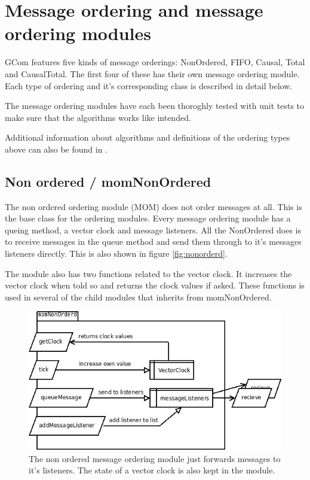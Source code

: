 \documentclass[english]{article}
\begin{document}
\section{Message ordering and message ordering modules}
\label{messageordering}
GCom features five kinds of message orderings: NonOrdered, FIFO, Causal, Total and CausalTotal. The first four of these has their own message ordering module. Each type of ordering and it's corresponding class is described in detail below.

The message ordering modules have each been thoroghly tested with unit tests to make sure that the algorithms works like intended.

Additional information about algorithms and definitions of the ordering types above can also be found in \cite{distsys-ordering}.

\subsection{Non ordered / momNonOrdered}
The non ordered ordering module (MOM) does not order messages at all. This is the base class for the ordering modules. Every message ordering module has a queing method, a vector clock and message listeners. All the NonOrdered does is to receive messages in the queue method and send them through to it's messages listeners directly. This is also shown in figure \vref{fig:nonorderd}.

The module also has two functions related to the vector clock. It increases the vector clock when told so and returns the clock values if asked. These functions is used in several of the child modules that inherits from momNonOrdered.

\begin{figure}
\includegraphics[width=\textwidth]{momNonOrderd.png}
\caption{The non ordered message ordering module just forwards messages to it's listeners. The state of a vector clock is also kept in the module.}
\label{fig:nonorderd}
\end{figure}
\end{document}
